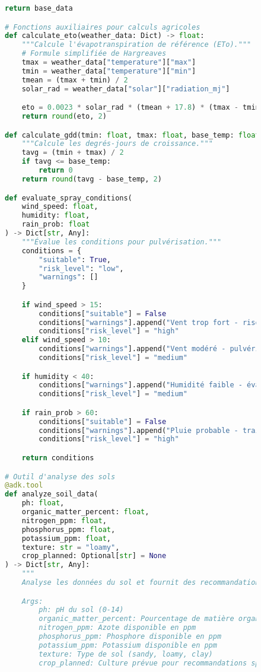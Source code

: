\begin{figure}[H]
\begin{lstlisting}[language=Python, caption=Implémentation d'outils spécialisés pour l'agriculture]
    return base_data

# Fonctions auxiliaires pour calculs agricoles
def calculate_eto(weather_data: Dict) -> float:
    """Calcule l'évapotranspiration de référence (ETo)."""
    # Formule simplifiée de Hargreaves
    tmax = weather_data["temperature"]["max"]
    tmin = weather_data["temperature"]["min"]
    tmean = (tmax + tmin) / 2
    solar_rad = weather_data["solar"]["radiation_mj"]

    eto = 0.0023 * solar_rad * (tmean + 17.8) * (tmax - tmin) ** 0.5
    return round(eto, 2)

def calculate_gdd(tmin: float, tmax: float, base_temp: float = 10) -> float:
    """Calcule les degrés-jours de croissance."""
    tavg = (tmin + tmax) / 2
    if tavg <= base_temp:
        return 0
    return round(tavg - base_temp, 2)

def evaluate_spray_conditions(
    wind_speed: float,
    humidity: float,
    rain_prob: float
) -> Dict[str, Any]:
    """Évalue les conditions pour pulvérisation."""
    conditions = {
        "suitable": True,
        "risk_level": "low",
        "warnings": []
    }

    if wind_speed > 15:
        conditions["suitable"] = False
        conditions["warnings"].append("Vent trop fort - risque de dérive")
        conditions["risk_level"] = "high"
    elif wind_speed > 10:
        conditions["warnings"].append("Vent modéré - pulvériser avec précaution")
        conditions["risk_level"] = "medium"

    if humidity < 40:
        conditions["warnings"].append("Humidité faible - évaporation rapide")
        conditions["risk_level"] = "medium"

    if rain_prob > 60:
        conditions["suitable"] = False
        conditions["warnings"].append("Pluie probable - traitement inefficace")
        conditions["risk_level"] = "high"

    return conditions

# Outil d'analyse des sols
@adk.tool
def analyze_soil_data(
    ph: float,
    organic_matter_percent: float,
    nitrogen_ppm: float,
    phosphorus_ppm: float,
    potassium_ppm: float,
    texture: str = "loamy",
    crop_planned: Optional[str] = None
) -> Dict[str, Any]:
    """
    Analyse les données du sol et fournit des recommandations.

    Args:
        ph: pH du sol (0-14)
        organic_matter_percent: Pourcentage de matière organique
        nitrogen_ppm: Azote disponible en ppm
        phosphorus_ppm: Phosphore disponible en ppm
        potassium_ppm: Potassium disponible en ppm
        texture: Type de sol (sandy, loamy, clay)
        crop_planned: Culture prévue pour recommandations spécifiques


\end{lstlisting}
\end{figure}
